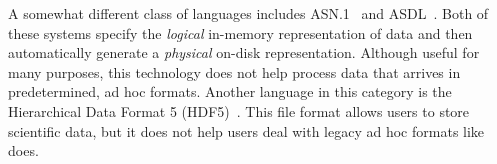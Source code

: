 

A somewhat different class of languages includes
\textsc{ASN.1}~\cite{asn} and \textsc{ASDL}~\cite{asdl}.  Both of
these systems specify the {\em logical\/} in-memory representation of
data and then automatically generate a {\em physical\/} on-disk
representation.  Although useful for many purposes, this technology
does not help process data that arrives in predetermined, ad hoc
formats.  Another language in this category is the Hierarchical Data
Format 5 (HDF5)~\cite{hdf5}.  This file format allows users to store
scientific data, but it does not help users deal with legacy ad hoc
formats like \padsml{} does.


